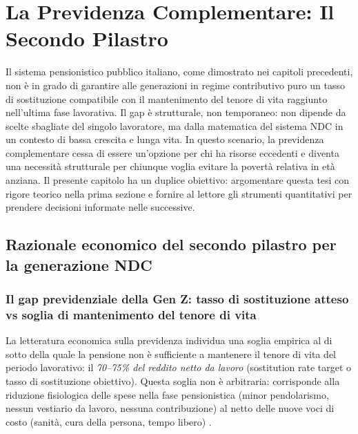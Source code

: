 ﻿%
\chapter{La Previdenza Complementare: Il Secondo Pilastro}

\noindent
Il sistema pensionistico pubblico italiano, come dimostrato nei capitoli
precedenti, non è in grado di garantire alle generazioni in regime
contributivo puro un tasso di sostituzione compatibile con il
mantenimento del tenore di vita raggiunto nell'ultima fase lavorativa.
Il gap è strutturale, non temporaneo: non dipende da scelte sbagliate
del singolo lavoratore, ma dalla matematica del sistema NDC in un
contesto di bassa crescita e lunga vita.
In questo scenario, la previdenza complementare cessa di essere un'opzione
per chi ha risorse eccedenti e diventa una necessità strutturale per
chiunque voglia evitare la povertà relativa in età anziana.
Il presente capitolo ha un duplice obiettivo: argomentare questa tesi
con rigore teorico nella prima sezione e fornire al lettore gli strumenti
quantitativi per prendere decisioni informate nelle successive.


\section{Razionale economico del secondo pilastro
         per la generazione NDC}
\label{sec:razionale_2p}

\subsection{Il gap previdenziale della Gen Z: tasso di sostituzione
            atteso vs soglia di mantenimento del tenore di vita}
\label{sub:gap_prev}

\noindent
La letteratura economica sulla previdenza individua una soglia empirica
al di sotto della quale la pensione non è sufficiente a mantenere il
tenore di vita del periodo lavorativo: il \emph{70--75\% del reddito netto
da lavoro} (sostitution rate target o tasso di sostituzione obiettivo).
Questa soglia non è arbitraria: corrisponde alla riduzione fisiologica
delle spese nella fase pensionistica (minor pendolarismo, nessun
vestiario da lavoro, nessuna contribuzione) al netto delle nuove voci
di costo (sanità, cura della persona, tempo libero) \cite{Bosi2018}.

